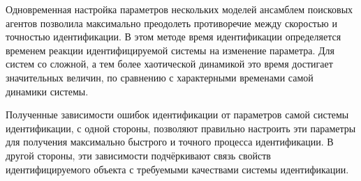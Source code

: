 \documentclass[a4paper,paratype,12pt,fouriernc]{cmonogra}
\begin{document}
Одновременная настройка параметров нескольких моделей ансамблем поисковых агентов
позволила максимально преодолеть противоречие между скоростью и точностью
идентификации. В этом методе время идентификации определяется
временем реакции идентифицируемой системы на изменение параметра.
Для систем со сложной, а тем более хаотической динамикой это время достигает
значительных величин, по сравнению с характерными временами самой динамики системы.


Полученные зависимости ошибок идентификации от параметров
самой системы идентификации, с одной стороны, позволяют
правильно настроить эти параметры для получения максимально быстрого
и точного процесса идентификации. В другой стороны, эти зависимости
подчёркивают связь свойств идентифицируемого объекта с
требуемыми качествами системы идентификации.


\printbibliography
\label{e:atu}{~}

\FloatBarrier
\end{document}
